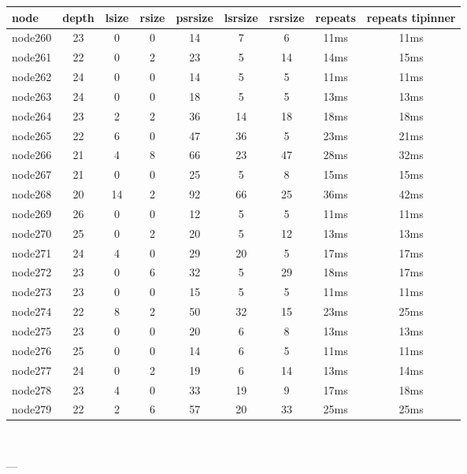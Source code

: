 \begin{tabular}{|l|c|c|c|c|c|c|c|c|}
\hline node & depth & lsize & rsize & psrsize & lsrsize & rsrsize   & repeats & repeats tipinner\\
    \hline node260 & 23 & 0 & 0 & 14 & 7 & 6 & 11ms & 11ms\\
    \hline node261 & 22 & 0 & 2 & 23 & 5 & 14 & 14ms & 15ms\\
    \hline node262 & 24 & 0 & 0 & 14 & 5 & 5 & 11ms & 11ms\\
    \hline node263 & 24 & 0 & 0 & 18 & 5 & 5 & 13ms & 13ms\\
    \hline node264 & 23 & 2 & 2 & 36 & 14 & 18 & 18ms & 18ms\\
    \hline node265 & 22 & 6 & 0 & 47 & 36 & 5 & 23ms & 21ms\\
    \hline node266 & 21 & 4 & 8 & 66 & 23 & 47 & 28ms & 32ms\\
    \hline node267 & 21 & 0 & 0 & 25 & 5 & 8 & 15ms & 15ms\\
    \hline node268 & 20 & 14 & 2 & 92 & 66 & 25 & 36ms & 42ms\\
    \hline node269 & 26 & 0 & 0 & 12 & 5 & 5 & 11ms & 11ms\\
    \hline node270 & 25 & 0 & 2 & 20 & 5 & 12 & 13ms & 13ms\\
    \hline node271 & 24 & 4 & 0 & 29 & 20 & 5 & 17ms & 17ms\\
    \hline node272 & 23 & 0 & 6 & 32 & 5 & 29 & 18ms & 17ms\\
    \hline node273 & 23 & 0 & 0 & 15 & 5 & 5 & 11ms & 11ms\\
    \hline node274 & 22 & 8 & 2 & 50 & 32 & 15 & 23ms & 25ms\\
    \hline node275 & 23 & 0 & 0 & 20 & 6 & 8 & 13ms & 13ms\\
    \hline node276 & 25 & 0 & 0 & 14 & 6 & 5 & 11ms & 11ms\\
    \hline node277 & 24 & 0 & 2 & 19 & 6 & 14 & 13ms & 14ms\\
    \hline node278 & 23 & 4 & 0 & 33 & 19 & 9 & 17ms & 18ms\\
    \hline node279 & 22 & 2 & 6 & 57 & 20 & 33 & 25ms & 25ms\\

\hline
\end{tabular} \

---


